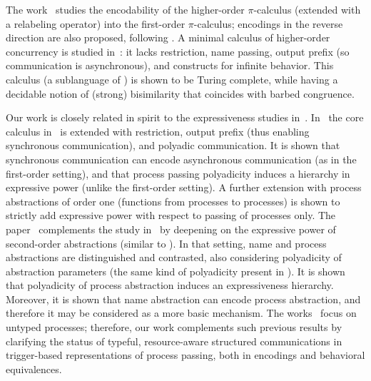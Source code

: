 The work~\cite{XuActa2012} studies the encodability of the higher-order $\pi$-calculus (extended with a relabeling operator) into the first-order $\pi$-calculus; encodings in the reverse direction are also proposed, following \cite{Tho90}.
A minimal calculus of higher-order concurrency is studied in~\cite{DBLP:journals/iandc/LanesePSS11}: it lacks restriction,  name passing, output prefix (so  communication is asynchronous), and constructs for infinite behavior. 
This calculus (a sublanguage of \HO) is shown to be Turing complete, while having a decidable notion of  
(strong) bisimilarity that coincides with barbed congruence. 

Our work is closely related in spirit to the expressiveness studies in~\cite{DBLP:conf/icalp/LanesePSS10,DBLP:conf/wsfm/XuYL13}.
In~\cite{DBLP:conf/icalp/LanesePSS10}
the core calculus in~\cite{DBLP:journals/iandc/LanesePSS11} is extended with restriction, output prefix (thus enabling synchronous communication), 
and polyadic communication. It is shown that 
synchronous communication can encode asynchronous communication (as in the first-order setting),
and that process passing polyadicity induces a hierarchy in expressive power (unlike the first-order setting).
A further extension with process abstractions of order one
(functions from processes to processes)
 is shown to strictly add expressive power with respect to passing of processes only.
The paper~\cite{DBLP:conf/wsfm/XuYL13} complements the study in~\cite{DBLP:conf/icalp/LanesePSS10} by deepening on the expressive power of second-order abstractions (similar to \HO). 
In that setting, name and process abstractions are distinguished and contrasted, also considering polyadicity of abstraction parameters (the same kind of polyadicity present in \pHOp). It is shown that polyadicity of process abstraction induces an expressiveness hierarchy. Moreover, it is shown that name abstraction can encode process abstraction, and therefore it may be considered as a more basic mechanism. 
The works~\cite{DBLP:conf/icalp/LanesePSS10,DBLP:conf/wsfm/XuYL13} focus on untyped processes;
therefore, our work complements such previous results by clarifying the status of typeful, resource-aware structured communications in
trigger-based representations of process passing, both in encodings and  behavioral equivalences.

